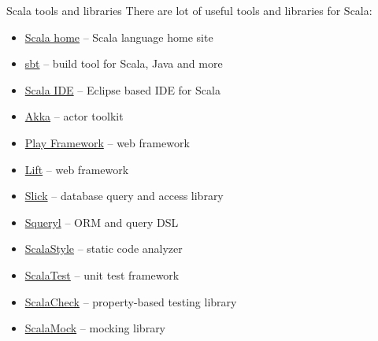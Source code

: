 \begin{frame}{Scala tools and libraries}
There are lot of useful tools and libraries for Scala:
\begin{itemize}
\item \href{http://www.scala-lang.org}{Scala home} -- Scala language home site
\item \href{http://www.scala-sbt.org}{sbt} -- build tool for Scala, Java and more
\item \href{http://www.scala-ide.org}{Scala IDE} -- Eclipse based IDE for Scala
\item \href{http://www.akka.io}{Akka} -- actor toolkit
\item \href{http://www.playframework.com}{Play Framework} -- web framework
\item \href{http://www.liftweb.net}{Lift} -- web framework
\item \href{http://slick.typesafe.com}{Slick} -- database query and access library
\item \href{http://squeryl.org}{Squeryl} -- ORM and query DSL
\item \href{http://www.scalastyle.org/}{ScalaStyle} -- static code analyzer
\item \href{http://www.scalatest.org}{ScalaTest} -- unit test framework
\item \href{http://www.scalacheck.org}{ScalaCheck} -- property-based testing library
\item \href{http://www.scalamock.org}{ScalaMock} -- mocking library
\end{itemize}
\end{frame}




